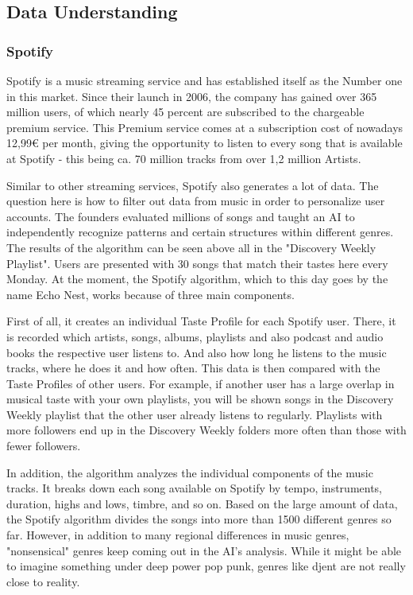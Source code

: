\subsection{Data Understanding}

\subsubsection{Spotify}
Spotify is a music streaming service and has established itself as the Number one in this market. 
Since their launch in 2006, the company has gained over 365 million users, of which nearly 45 percent
are subscribed to the chargeable premium service. 
This Premium service comes at a subscription cost of nowadays 12,99€ per month,
giving the opportunity to listen to every song that is available at Spotify - this being
ca. 70 million tracks from over 1,2 million Artists.

Similar to other streaming services, Spotify also generates a lot of data.
The question here is how to filter out data from music in order to personalize user accounts. 
The founders evaluated millions of songs and taught an AI to independently recognize
patterns and certain structures within different genres. 
The results of the algorithm can be seen above all in the "Discovery Weekly Playlist". 
Users are presented with 30 songs that match their tastes here every Monday.
At the moment, the Spotify algorithm, which to this day goes by the name Echo Nest,
works because of three main components. 

First of all, it creates an individual Taste Profile for each Spotify user. 
There, it is recorded which artists, songs, albums, playlists and also podcast and audio books the
respective user listens to. 
And also how long he listens to the music tracks, where he does it and how often.
This data is then compared with the Taste Profiles of other users. 
For example, if another user has a large overlap in musical taste with your own playlists,
you will be shown songs in the Discovery Weekly playlist that the other user already listens to regularly.
Playlists with more followers end up in the Discovery Weekly folders more often than those with
fewer followers. 

In addition, the algorithm analyzes the individual components of the music tracks. 
It breaks down each song available on Spotify by tempo, instruments, duration, highs and lows,
timbre, and so on. 
Based on the large amount of data, the Spotify algorithm divides the songs into more than 1500
different genres so far. 
However, in addition to many regional differences in music genres, "nonsensical" genres keep
coming out in the AI's analysis. While it might be able to imagine something under deep power pop punk,
genres like djent are not really close to reality. 

